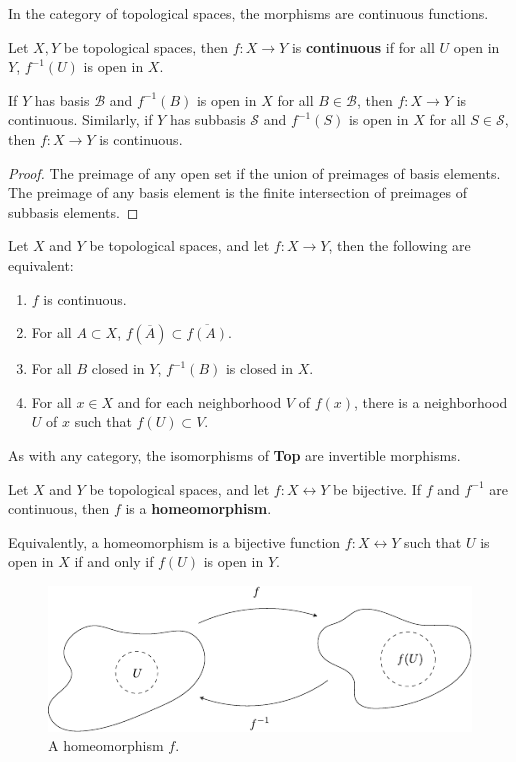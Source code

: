 \documentclass[10pt]{report}
\begin{document}
In the category of topological spaces, the morphisms are continuous functions.

\begin{defn}
	Let $X,Y$ be topological spaces, then $f : X \to Y$ is \textbf{continuous} if for all $U$ open in $Y$, $f^{-1}(U)$ is open in $X$.
\end{defn}

\begin{prop}
	If $Y$ has basis $\mathcal{B}$ and $f^{-1}(B)$ is open in $X$ for all $B \in \mathcal{B}$, then $f: X \to Y$ is continuous.
	Similarly, if $Y$ has subbasis $\mathcal{S}$ and $f^{-1}(S)$ is open in $X$ for all $S \in \mathcal{S}$, then $f: X \to Y$ is continuous.
\end{prop}
\begin{proof}
	The preimage of any open set if the union of preimages of basis elements. The preimage of any basis element is the finite intersection of preimages of subbasis elements.
\end{proof}

\begin{thrm}
Let $X$ and $Y$ be topological spaces, and let $f: X \to Y$, then the following are equivalent:
\begin{enumerate}
	\item $f$ is continuous.
	\item For all $A \subset X$, $f(\overline{A}) \subset \overline{f(A)} $.
	\item For all $B$ closed in $Y$, $f^{-1}(B)$ is closed in $X$.
	\item For all $x \in X$ and for each neighborhood $V$ of $f(x)$, there is a neighborhood $U$ of $x$ such that $f(U) \subset V$.
\end{enumerate}
\end{thrm}

As with any category, the isomorphisms of \textbf{Top} are invertible morphisms.

\begin{defn}
	Let $X$ and $Y$ be topological spaces, and let $f: X \leftrightarrow Y$ be bijective. If $f$ and $f^{-1}$ are continuous, then $f$ is a \textbf{homeomorphism}.

	Equivalently, a homeomorphism is a bijective function $f: X \leftrightarrow Y$ such that $U$ is open in $X$ if and only if $f(U)$ is open in $Y$.
\end{defn}

\begin{figure}[H]
	\centering
	\includegraphics[scale=1.3]{fig/homeomorphism.pdf}
	\caption{A homeomorphism $f$.}
\end{figure}
\end{document}
